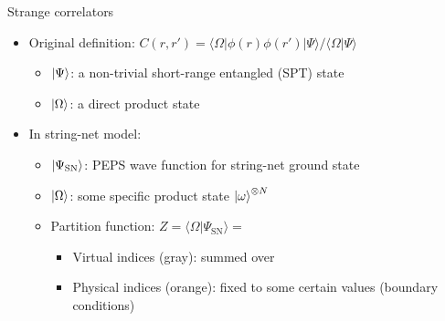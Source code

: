\documentclass{fdubeamer}
\newcommand{\tikzinput}[1]{}
\newcommand{\1}{\mathbb{1}}
\begin{document}
\begin{frame}{Strange correlators}

\begin{itemize}
  \item Original definition: $C(r,r') = \langle\Omega|\phi(r)\phi(r')|\Psi\rangle / \langle\Omega|\Psi\rangle$

    \begin{itemize}
      \item $\ket{\Psi}$: a non-trivial short-range entangled (SPT) state
      \item $\ket{\Omega}$: a direct product state
    \end{itemize}

  \item In string-net model:

    \begin{itemize}
      \item $\ket{\Psi_\mathrm{SN}}$: PEPS wave function for string-net ground state
      \item $\ket{\Omega}$: some specific product state $\ket{\omega}^{\otimes N}$
      \item Partition function: $Z = \langle\Omega|\Psi_\mathrm{SN}\rangle = \tikzinput{strange-correlator}$

        \begin{itemize}
          \item Virtual indices (gray): summed over
          \item Physical indices (orange): fixed to some certain values (boundary conditions)
        \end{itemize}
    \end{itemize}
\end{itemize}

\end{frame}
\end{document}
